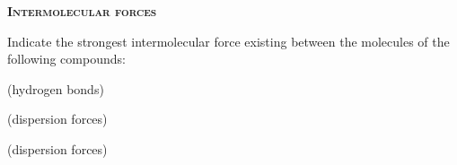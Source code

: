 \documentclass[main.tex]{subfiles}
\begin{document}
\newpage
\setdoublesep{0.35700 em}  %
\setatomsep{1.78500 em}    %
\setbondoffset{0.18265 em} %
\newcommand{\bondwidth}{0.06642 em} %
\setbondstyle{line width = \bondwidth}
\fancyhfoffset[E,O]{0pt}
\setlength{\columnsep}{30pt}
\begin{conclusion}
\end{conclusion}
\begin{multicols*}{2}\setcounter{numA}{1}  %


{\raggedright\textsc{\textbf{Intermolecular forces }}\par}

\begin{question}[ID=\the\value{numA}]
Indicate the strongest intermolecular force existing between the molecules of the following compounds:
\begin{inparaenum}[(a)]
\item {} %
\item  {} %
 \item  {} %
\end{inparaenum}
\end{question}
\begin{solution}
\begin{inparaenum}[(a)]
\item {}  (hydrogen bonds)
\item  {}  (dispersion forces)
 \item  {}  (dispersion forces)
\end{inparaenum}\hspace{0.1cm}\end{solution}


\end{multicols*}
\end{document}
